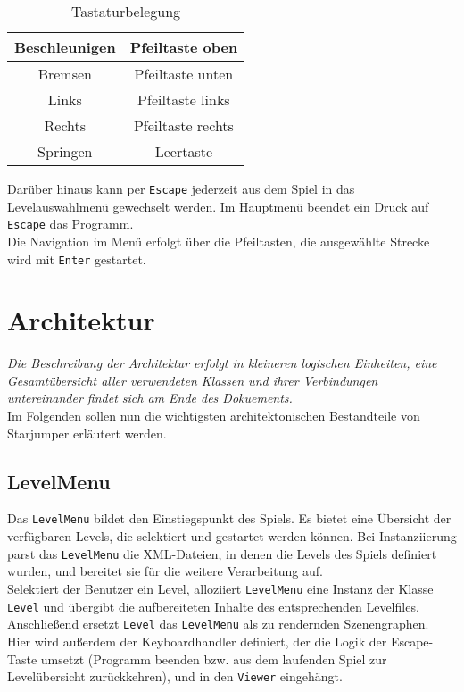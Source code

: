 \documentclass{llncs}
\begin{document}
\begin{table}[H]
	\begin{center}
		\begin{tabular}{|c|c|}
			\hline
			Beschleunigen & Pfeiltaste oben \\
			\hline
			Bremsen & Pfeiltaste unten \\
			\hline
			Links & Pfeiltaste links \\
			\hline
			Rechts & Pfeiltaste rechts \\
			\hline
			Springen & Leertaste \\
			\hline
		\end{tabular}
	\end{center}
	\caption{Tastaturbelegung}
\end{table}
\noindent Dar\"uber hinaus kann per \texttt{Escape} jederzeit aus dem Spiel in das Levelauswahlmen\"u
gewechselt werden. Im Hauptmen\"u beendet ein Druck auf \texttt{Escape} das Programm.\\
Die Navigation im Men\"u erfolgt \"uber die Pfeiltasten, die ausgew\"ahlte Strecke wird mit \texttt{Enter} gestartet.


\section{Architektur}

\textit{Die Beschreibung der Architektur erfolgt in kleineren logischen Einheiten, eine Gesamt\"ubersicht
aller verwendeten Klassen und ihrer Verbindungen untereinander findet sich am Ende des Dokuements.}\\
Im Folgenden sollen nun die wichtigsten architektonischen Bestandteile von Starjumper
erl\"autert werden.

\subsection{LevelMenu}
Das \texttt{LevelMenu} bildet den Einstiegspunkt des Spiels. Es bietet eine \"Ubersicht der verf\"ugbaren
Levels, die selektiert und gestartet werden k\"onnen. Bei Instanziierung parst das \texttt{LevelMenu} die
XML-Dateien, in denen die Levels des Spiels definiert wurden, und bereitet sie f\"ur die weitere Verarbeitung auf.\\
Selektiert der Benutzer ein Level, alloziiert \texttt{LevelMenu} eine Instanz der Klasse \texttt{Level} und
\"ubergibt die aufbereiteten Inhalte des entsprechenden Levelfiles. Anschlie\ss end ersetzt \texttt{Level}
das \texttt{LevelMenu} als zu rendernden Szenengraphen.\\
Hier wird au\ss erdem der Keyboardhandler definiert, der die Logik der Escape-Taste umsetzt (Programm beenden
bzw. aus dem laufenden Spiel zur Level\"ubersicht zur\"uckkehren), und in den \texttt{Viewer} eingeh\"angt. 
\end{document}
